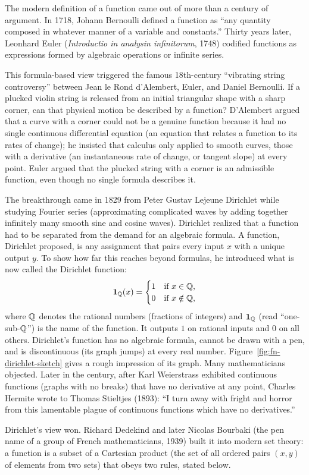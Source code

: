\begin{historybox}
The modern definition of a function came out of more than a century of argument. In 1718, Johann Bernoulli defined a function as ``any quantity composed in whatever manner of a variable and constants.'' Thirty years later, Leonhard Euler (\emph{Introductio in analysin infinitorum}, 1748) codified functions as expressions formed by algebraic operations or infinite series. 

This formula-based view triggered the famous 18th-century ``vibrating string controversy'' between Jean le Rond d'Alembert, Euler, and Daniel Bernoulli. If a plucked violin string is released from an initial triangular shape with a sharp corner, can that physical motion be described by a function? D'Alembert argued that a curve with a corner could not be a genuine function because it had no single continuous differential equation (an equation that relates a function to its rates of change); he insisted that calculus only applied to smooth curves, those with a derivative (an instantaneous rate of change, or tangent slope) at every point. Euler argued that the plucked string with a corner is an admissible function, even though no single formula describes it.

The breakthrough came in 1829 from Peter Gustav Lejeune Dirichlet while studying Fourier series (approximating complicated waves by adding together infinitely many smooth sine and cosine waves). Dirichlet realized that a function had to be separated from the demand for an algebraic formula. A function, Dirichlet proposed, is any assignment that pairs every input $x$ with a unique output $y$. To show how far this reaches beyond formulas, he introduced what is now called the Dirichlet function:
\[
\mathbf{1}_{\mathbb{Q}}(x) = \begin{cases} 1 & \text{if } x \in \mathbb{Q}, \\ 0 & \text{if } x \notin \mathbb{Q}, \end{cases}
\]
where $\mathbb{Q}$ denotes the rational numbers (fractions of integers) and $\mathbf{1}_{\mathbb{Q}}$ (read ``one-sub-$\mathbb{Q}$'') is the name of the function. It outputs $1$ on rational inputs and $0$ on all others. Dirichlet's function has no algebraic formula, cannot be drawn with a pen, and is discontinuous (its graph jumps) at every real number. Figure~\ref{fig:fn-dirichlet-sketch} gives a rough impression of its graph. Many mathematicians objected. Later in the century, after Karl Weierstrass exhibited continuous functions (graphs with no breaks) that have no derivative at any point, Charles Hermite wrote to Thomas Stieltjes (1893): ``I turn away with fright and horror from this lamentable plague of continuous functions which have no derivatives.''

Dirichlet's view won. Richard Dedekind and later Nicolas Bourbaki (the pen name of a group of French mathematicians, 1939) built it into modern set theory: a function is a subset of a Cartesian product (the set of all ordered pairs $(x, y)$ of elements from two sets) that obeys two rules, stated below.
\end{historybox}

